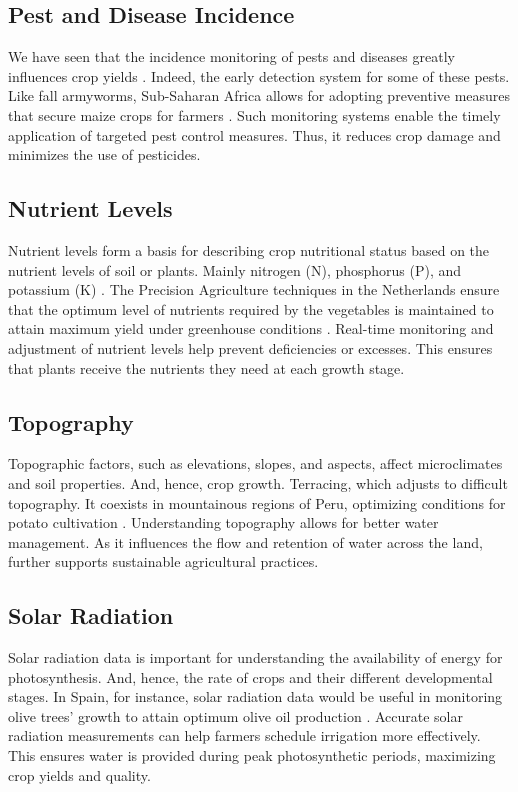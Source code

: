 \documentclass[conference]{IEEEtran}
\begin{document}
\subsection{Pest and Disease Incidence}\label{AA}
We have seen that the incidence monitoring of pests and diseases greatly influences crop yields \cite{b60}. Indeed, the early detection system for some of these pests. Like fall armyworms, Sub-Saharan Africa allows for adopting preventive measures that secure maize crops for farmers \cite{b61}. Such monitoring systems enable the timely application of targeted pest control measures. Thus, it reduces crop damage and minimizes the use of pesticides.

\subsection{Nutrient Levels}\label{AA}
Nutrient levels form a basis for describing crop nutritional status based on the nutrient levels of soil or plants. Mainly nitrogen (N), phosphorus (P), and potassium (K) \cite{b62}. The Precision Agriculture techniques in the Netherlands ensure that the optimum level of nutrients required by the vegetables is maintained to attain maximum yield under greenhouse conditions \cite{b63}. Real-time monitoring and adjustment of nutrient levels help prevent deficiencies or excesses. This ensures that plants receive the nutrients they need at each growth stage.

\subsection{Topography}\label{AA}
Topographic factors, such as elevations, slopes, and aspects, affect microclimates and soil properties. And, hence, crop growth. Terracing, which adjusts to difficult topography. It coexists in mountainous regions of Peru, optimizing conditions for potato cultivation \cite{b64}. Understanding topography allows for better water management. As it influences the flow and retention of water across the land, further supports sustainable agricultural practices.

\subsection{Solar Radiation}\label{AA}
Solar radiation data is important for understanding the availability of energy for photosynthesis. And, hence, the rate of crops and their different developmental stages. In Spain, for instance, solar radiation data would be useful in monitoring olive trees' growth to attain optimum olive oil production \cite{b65}. Accurate solar radiation measurements can help farmers schedule irrigation more effectively. This ensures water is provided during peak photosynthetic periods, maximizing crop yields and quality.
\end{document}

